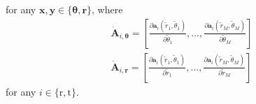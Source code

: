 \documentclass[10pt,journal,twocolumn]{IEEEtran}
\begin{document}
for any $ \mathbf{x},\mathbf{y}\in\{\bm{\theta},\bm{r}\}$, where
\begin{subequations}
\begin{align}
\dot{\mathbf{A}}_{i,\bm{\theta}} = \left[\frac{\partial \mathbf{a}_i\left(\tilde r_1,\tilde\theta_1\right)}{\partial \tilde\theta_1},\dots,\frac{\partial \mathbf{a}_i\left(\tilde r_M,\tilde\theta_M\right)}{\partial \tilde\theta_M}\right]\\
\dot{\mathbf{A}}_{i,\bm{r}} = \left[\frac{\partial \mathbf{a}_i\left(\tilde r_1,\tilde \theta_1\right)}{\partial \tilde r_1},\dots,\frac{\partial \mathbf{a}_i\left(\tilde r_M,\tilde\theta_M\right)}{\partial \tilde r_M}\right]
\end{align}
\end{subequations}
for any $i\in\{\text{r},\text{t}\}$.



	\ifCLASSOPTIONcaptionsoff
	\newpage
	\fi
	
	
	
	
\end{document}
